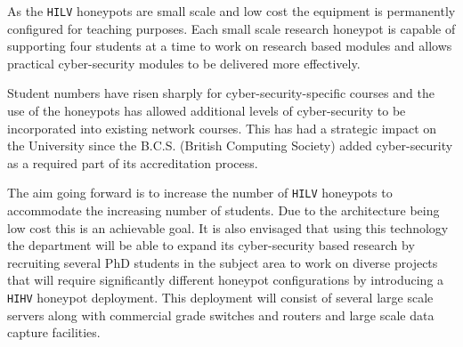 As the \texttt{HILV} honeypots are small scale and low cost the equipment is permanently configured for teaching purposes. Each small scale research honeypot is capable of supporting four students at a time to work on research based modules and allows practical cyber-security modules to be delivered more effectively.

Student numbers have risen sharply for cyber-security-specific courses and the use of the honeypots has allowed additional levels of cyber-security to be incorporated into existing network courses. This has had a strategic impact on the University since the B.C.S. (British Computing Society) added cyber-security as a required part of its accreditation process. 

The aim going forward is to increase the number of \texttt{HILV} honeypots to accommodate the increasing number of students. Due to the architecture being low cost this is an achievable goal. It is also envisaged that using this technology the department will be able to expand its cyber-security based research by recruiting several PhD students in the subject area to work on diverse projects that will require significantly different honeypot configurations by introducing a \texttt{HIHV} honeypot deployment. This deployment will consist of several large scale servers along with commercial grade switches and routers and large scale data capture facilities.  


